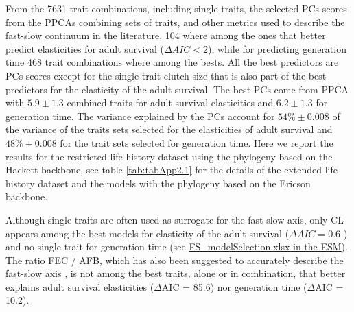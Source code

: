 From the 7631 trait combinations, including single traits, the selected PCs 
scores from the PPCAs combining sets of traits, and other metrics used to 
describe the fast-slow continuum in the literature, 104 where among 
the ones that better predict elasticities for adult survival ($\Delta AIC < 2$),
while for predicting generation time 468 trait combinations where among the
bests. All the best predictors are PCs scores except for the single trait clutch
size that is also part of the best predictors for the elasticity of the adult
survival.
The best PCs come from PPCA with $5.9 \pm 1.3$ combined traits for adult 
survival elasticities and $6.2 \pm 1.3$ for generation time. The variance 
explained by the PCs account for $54\% \pm 0.008$ of the variance of the traits 
sets selected for the elasticities of adult survival and $48\% \pm 0.008$ 
for the trait sets selected for generation time. Here we report the results for 
the restricted life history dataset using the phylogeny based on the Hackett 
backbone, see table \ref{tab:tabApp2.1} for the details of the extended life
history dataset and the models with the phylogeny based on the Ericson backbone.

Although single traits are often used as surrogate for the fast-slow axis, only
CL appears among the best models for elasticity of the adult survival ($\Delta
AIC = 0.6$ ) and no single trait for generation time (see
\href{https://github.com/jmaspons/Thesis/tree/master/ESM/chapter02}{
FS\_modelSelection.xlsx in the ESM}). The ratio FEC / AFB, which has also been
suggested to accurately describe the fast-slow axis \citep{Oli2004}⁠, is not
among the best traits, alone or in combination, that better explains adult
survival elasticities ($\Delta$AIC = 85.6) nor generation time ($\Delta$AIC =
10.2).

